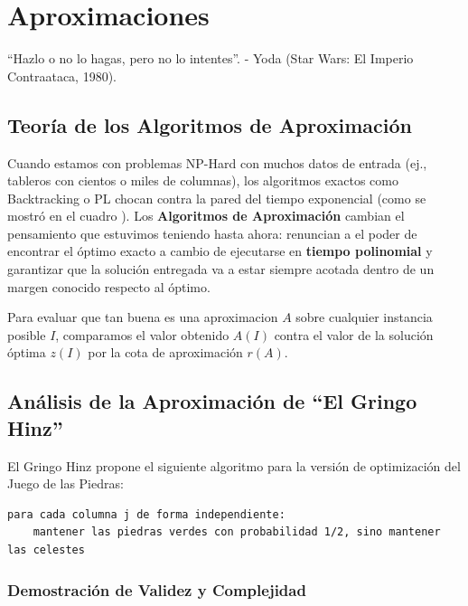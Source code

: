 \section{Aproximaciones}
``Hazlo o no lo hagas, pero no lo intentes''. - Yoda (Star Wars: El Imperio Contraataca, 1980).
\subsection{Teoría de los Algoritmos de Aproximación}

Cuando estamos con problemas NP-Hard con muchos datos de entrada (ej., tableros con cientos o miles de columnas), los algoritmos exactos como Backtracking o PL chocan contra la pared del tiempo exponencial (como se mostró en el cuadro \label{ref:tabla1}). Los \textbf{Algoritmos de Aproximación} cambian el pensamiento que estuvimos teniendo hasta ahora: renuncian a el poder de encontrar el óptimo exacto a cambio de ejecutarse en \textbf{tiempo polinomial} y garantizar que la solución entregada va a estar siempre acotada dentro de un margen conocido respecto al óptimo.

Para evaluar que tan buena es una aproximacion $A$ sobre cualquier instancia posible $I$, comparamos el valor obtenido $A(I)$ contra el valor de la solución óptima $z(I)$ por la cota de aproximación $r(A)$.

\subsection{Análisis de la Aproximación de ``El Gringo Hinz''}
\label{sec:hinz}

El Gringo Hinz propone el siguiente algoritmo para la versión de optimización del Juego de las Piedras:
\begin{lstlisting}[mathescape=true]
para cada columna j de forma independiente:
    mantener las piedras verdes con probabilidad 1/2, sino mantener las celestes
\end{lstlisting}

\subsubsection{Demostración de Validez y Complejidad}


